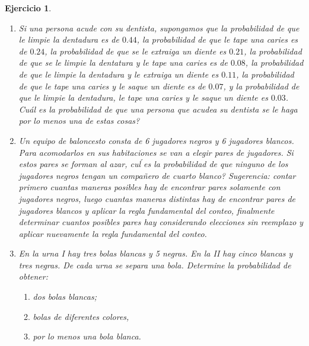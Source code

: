 \documentclass[12pt,twoside]{article}
\newtheorem{Ejer}{Ejercicio}
\newcommand{\Prob}{\mathbb{P}}
\begin{document}
\begin{Ejer}
\begin{enumerate}
\begin{enumerate}
Sugerencia: $\Prob\left[A\cup B\cup C\right]=\Prob\left[A\right]+\Prob\left[B\right]+\Prob\left[C\right]-\Prob\left[A\cap B\right]-\Prob\left[A\cap C\right]-\Prob\left[B\cap C\right]+\Prob\left[A\cap B\cap C\right]$
\end{enumerate}

\item Si una persona acude con su dentista, supongamos que la probabilidad de que le limpie la dentadura es de $0.44$, la probabilidad de que le tape una caries es de $0.24$, la probabilidad de que se le extraiga un diente es  $0.21$, la probabilidad de que se le limpie la dentatura y le tape una caries es de $0.08$, la probabilidad de que le limpie la dentadura y le extraiga un diente es $0.11$, la probabilidad de que le tape una caries y le saque un diente es de $0.07$, y la probabilidad de que le limpie la dentadura, le tape una caries y le saque un diente es $0.03$.  Cu\'{a}l es la probabilidad de que una persona que acudea su dentista se le haga por lo menos una de estas cosas?

\item Un equipo de baloncesto consta de 6 jugadores negros y 6 jugadores blancos. Para acomodarlos en sus habitaciones se van a elegir pares de jugadores. Si estos pares se forman al azar,  cu\'l es la probabilidad de que ninguno de los jugadores negros tengan un compa\~nero de cuarto blanco? Sugerencia: contar primero cuantas maneras posibles hay de encontrar pares solamente con jugadores negros, luego cuantas maneras distintas hay de encontrar pares de jugadores blancos y aplicar la regla fundamental del conteo, finalmente determinar cuantos posibles pares hay considerando elecciones sin reemplazo y aplicar nuevamente la regla fundamental del conteo.

\item En la urna I hay tres bolas blancas y 5 negras. En la II hay cinco blancas y tres negras. De cada urna se separa una bola. Determine la probabilidad de obtener:
\begin{enumerate}
\item dos bolas blancas;
\item bolas de diferentes colores,
\item por lo menos una bola blanca.
\end{enumerate}
\end{enumerate}
\end{Ejer}
\end{document}
